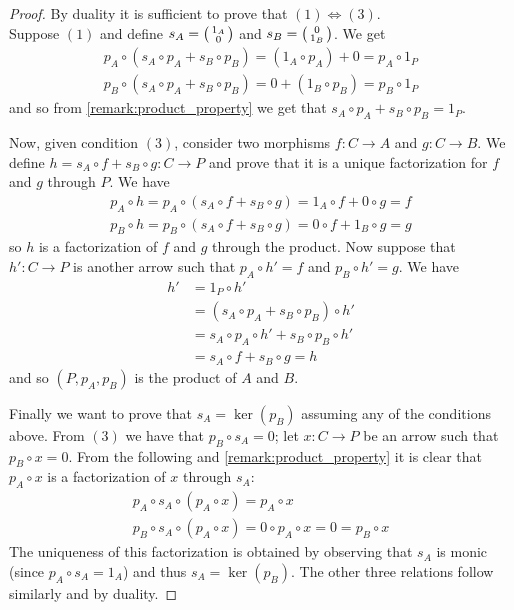 \begin{proof}
  By duality it is sufficient to prove that \((1) \Leftrightarrow (3)\).\\

  Suppose \((1)\) and define \(s_A=\left(\begin{smallmatrix}1_A\\ 0\end{smallmatrix}\right)\) and \(s_B=\left(\begin{smallmatrix}0\\ 1_B\end{smallmatrix}\right)\). We get
  \begin{align*}
    p_A\circ(s_A\circ p_A + s_B\circ p_B) = (1_A\circ p_A) + 0 = p_A\circ 1_P \\
    p_B\circ(s_A\circ p_A + s_B\circ p_B) = 0 + (1_B\circ p_B) = p_B\circ 1_P
  \end{align*}
  and so from \ref{remark:product_property} we get that \(s_A\circ p_A + s_B\circ p_B = 1_P\).

  Now, given condition \((3)\), consider two morphisms \(f\colon C\to A\) and \(g\colon C\to B\). We define \(h= s_A\circ f + s_B\circ g\colon C\to P\) and prove that it is a unique factorization for \(f\) and \(g\) through \(P\). We have
  \begin{align*}
    p_A\circ h = p_A\circ(s_A\circ f + s_B\circ g) = 1_A\circ f + 0\circ g = f\\
    p_B\circ h = p_B\circ(s_A\circ f + s_B\circ g) = 0\circ f + 1_B\circ g = g
  \end{align*}
  so \(h\) is a factorization of \(f\) and \(g\) through the product. Now suppose that \(h':C\to P\) is another arrow such that \(p_A\circ h' = f\) and \(p_B\circ h' = g\). We have
  \begin{align*}
    h' & = 1_P\circ h'\\
       &= (s_A\circ p_A + s_B\circ p_B)\circ h'\\
       & = s_A\circ p_A\circ h' + s_B\circ p_B\circ h' \\
       & = s_A\circ f + s_B\circ g = h
  \end{align*}
  and so \((P,p_A,p_B)\) is the product of \(A\) and \(B\).

  Finally we want to prove that \(s_A=\ker(p_B)\) assuming any of the conditions above. From \((3)\) we have that \(p_B\circ s_A = 0\); let \(x\colon C\to P\) be an arrow such that \(p_B\circ x = 0\). From the following and \ref{remark:product_property} it is clear that \(p_A\circ x\) is a factorization of \(x\) through \(s_A\):
  \begin{gather*}
    p_A\circ s_A\circ(p_A\circ x) = p_A\circ x\\
    p_B\circ s_A\circ(p_A\circ x) = 0 \circ p_A\circ x = 0 = p_B\circ x
  \end{gather*}
  The uniqueness of this factorization is obtained by observing that \(s_A\) is monic (since \(p_A\circ s_A = 1_A\)) and thus \(s_A=\ker(p_B)\). The other three relations follow similarly and by duality.
\end{proof}

